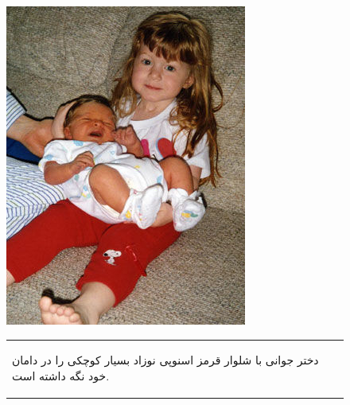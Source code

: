 \documentclass[runningheads]{llncs}
\begin{document}
\begin{figure}[htbp]
\begin{center}
  \begin{minipage}[t]{0.3\textwidth} 
    \vspace{0pt}
    \includegraphics[width=\textwidth]{2656351.jpg}
  \end{minipage}
  \begin{minipage}[t]{0.6\textwidth}
    \vspace{0pt} %
    \begin{tabularx}{\linewidth}{|X|} \hline
      \begin{farsi} \arabicfont\small دختر جوانی با شلوار قرمز اسنوپی نوزاد بسیار کوچکی را در دامان خود نگه داشته است.\end{farsi} \\ 

\end{tabularx}
\end{minipage}
\end{center}
\end{figure}
\end{document}
